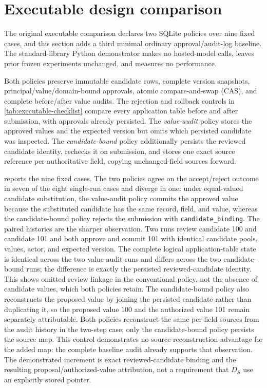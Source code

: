 \documentclass[preprint,12pt,authoryear]{elsarticle}
\newcommand{\code}[1]{\nolinkurl{#1}}
\begin{document}



\section{Executable design comparison}
\label{sec:supp-executable}

The original executable comparison declares two SQLite policies over nine fixed cases, and this section adds a third minimal ordinary approval/audit-log baseline.
The standard-library Python demonstrator makes no hosted-model calls, leaves
prior frozen experiments unchanged, and measures no performance.

Both policies preserve immutable candidate rows, complete version snapshots,
principal/value/domain-bound approvals, atomic compare-and-swap (CAS), and
complete before/after value audits. The rejection and rollback controls in
\cref{tab:executable-checklist} compare every application table before and after
submission, with approvals already persisted. The
\emph{value-audit} policy stores the approved values and the expected version
but omits which persisted candidate was inspected. The \emph{candidate-bound}
policy additionally persists the reviewed candidate identity, rechecks it on
submission, and stores one exact source reference per authoritative field,
copying unchanged-field sources forward.



 reports the nine fixed cases. The two policies
agree on the accept/reject outcome in seven of the eight single-run cases and
diverge in one: under equal-valued candidate substitution, the value-audit
policy commits the approved value because the substituted candidate has the
same record, field, and value, whereas the candidate-bound policy rejects the
submission with \code{candidate_binding}. The paired histories are the sharper
observation. Two runs review candidate 100 and candidate 101 and both approve
and commit 101 with identical candidate pools, values, actor, and expected
version. The complete logical application-table state is identical across the two
value-audit runs and differs across the two candidate-bound runs; the
difference is exactly the persisted reviewed-candidate identity. This shows
omitted review linkage in the conventional policy, not the absence of
candidate values, which both policies retain. The candidate-bound policy also
reconstructs the proposed value by joining the persisted candidate rather than
duplicating it, so the proposed value 100 and the authorized value 101 remain
separately attributable. Both policies reconstruct the same per-field sources
from the audit history in the two-step case; only the candidate-bound policy
persists the source map. This control demonstrates no source-reconstruction
advantage for the added map: the complete baseline audit already supports that
observation. The demonstrated increment is exact reviewed-candidate binding and
the resulting proposal/authorized-value attribution, not a requirement that
$D_S$ use an explicitly stored pointer.
\end{document}
